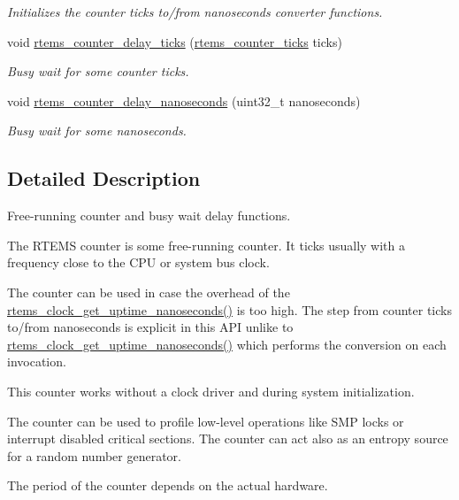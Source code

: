 \begin{DoxyCompactItemize}
\begin{DoxyCompactList}\small\item\em Initializes the counter ticks to/from nanoseconds converter functions. \end{DoxyCompactList}\item 
void \mbox{\hyperlink{group__ClassicCounter_gae1a4a949021ae54cf5d1c267fe0f9493}{rtems\+\_\+counter\+\_\+delay\+\_\+ticks}} (\mbox{\hyperlink{group__ClassicCounter_gafda796220404920ac0af841d9f555262}{rtems\+\_\+counter\+\_\+ticks}} ticks)
\begin{DoxyCompactList}\small\item\em Busy wait for some counter ticks. \end{DoxyCompactList}\item 
void \mbox{\hyperlink{group__ClassicCounter_gaa8fddf3e4ad1abb10170e61db04525ae}{rtems\+\_\+counter\+\_\+delay\+\_\+nanoseconds}} (uint32\+\_\+t nanoseconds)
\begin{DoxyCompactList}\small\item\em Busy wait for some nanoseconds. \end{DoxyCompactList}\end{DoxyCompactItemize}


\subsection{Detailed Description}
Free-\/running counter and busy wait delay functions. 

The R\+T\+E\+MS counter is some free-\/running counter. It ticks usually with a frequency close to the C\+PU or system bus clock.

The counter can be used in case the overhead of the \mbox{\hyperlink{group__ClassicClock_ga0e2b9de0054d75a0820203f00e152aa7}{rtems\+\_\+clock\+\_\+get\+\_\+uptime\+\_\+nanoseconds()}} is too high. The step from counter ticks to/from nanoseconds is explicit in this A\+PI unlike to \mbox{\hyperlink{group__ClassicClock_ga0e2b9de0054d75a0820203f00e152aa7}{rtems\+\_\+clock\+\_\+get\+\_\+uptime\+\_\+nanoseconds()}} which performs the conversion on each invocation.

This counter works without a clock driver and during system initialization.

The counter can be used to profile low-\/level operations like S\+MP locks or interrupt disabled critical sections. The counter can act also as an entropy source for a random number generator.

The period of the counter depends on the actual hardware. 

